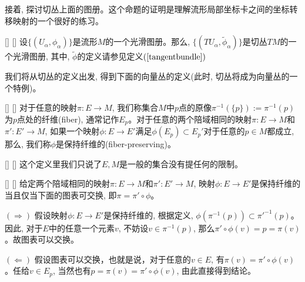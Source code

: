\documentclass[UTF8]{ctexart}
\begin{document}
    接着, 探讨切丛上面的图册。这个命题的证明是理解流形局部坐标卡之间的坐标转移映射的一个很好的练习。

    \begin{ppt}
        []
        {}
        []
        []
        设$\{(U_{\alpha}, \phi_{\alpha})\}$是流形$M$的一个光滑图册。那么, $\{(T U_{\alpha}, \tilde{\phi}_{\alpha})\}$是切丛$TM$的一个光滑图册, 其中, $\tilde{\phi}$的定义请参见定义$(\ref{tangentbundle})$
    \end{ppt}

    我们将从切丛的定义出发, 得到下面的向量丛的定义(此时, 切丛将成为向量丛的一个特例)。

    \begin{dfn}
        []
        {}
        []
        []
        对于任意的映射$\pi : E \rightarrow M$, 我们称集合$M$中$p$点的原像$\pi^{-1} (\{p\}) := \pi^{-1}(p)$为$p$点处的纤维(fiber), 通常记作$E_p$。对于任意的两个陪域相同的映射$\pi: E \rightarrow M$和$\pi' : E' \rightarrow M$, 如果一个映射$\phi: E \rightarrow E'$满足$\phi(E_p) \subset E_p '$对于任意的$p \in M$都成立, 那么, 我们称$\phi$是保持纤维的(fiber-preserving)。
    \end{dfn}

    \begin{rmk}
        []
        {}
        []
        []
        这个定义里我们只说了$E, M$是一般的集合没有提任何的限制。
    \end{rmk}

    \begin{ppt}
        []
        {}
        []
        []
        给定两个陪域相同的映射$\pi: E \rightarrow M$和$\pi' : E' \rightarrow M$, 映射$\phi: E \rightarrow E'$是保持纤维的当且仅当下面的图表可交换, 即$\pi = \pi' \circ \phi$。
    \end{ppt}

    \begin{prf}
        
        
        
        

        $(\Rightarrow)$ 假设映射$\phi: E \rightarrow E'$是保持纤维的, 根据定义, $\phi(\pi^{-1}(p)) \subset \pi'^{-1}(p)$。因此, 对于$E$中的任意一个元素$v$, 不妨设$v \in \pi^{-1}(p)$, 那么$\pi' \circ \phi (v) = p = \pi(v)$。故图表可以交换。
        
        $(\Leftarrow)$ 假设图表可以交换，也就是说，对于任意的$v \in  E$, 有$\pi(v) = \pi' \circ \phi(v)$。任给$v \in E_p$, 当然也有$p = \pi(v) = \pi' \circ \phi(v)$, 由此直接得到结论。
    \end{prf}
\end{document}
